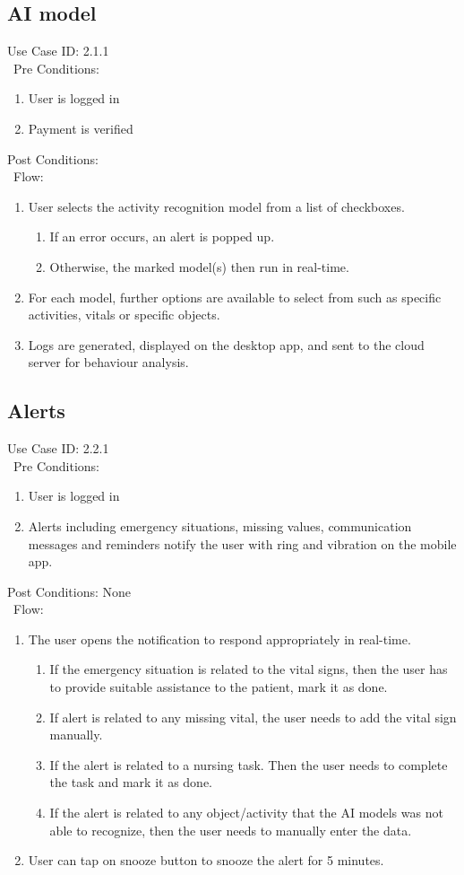 \subsection{AI model} 
Use Case ID: 2.1.1\\\
Pre Conditions: 
\begin{enumerate}
    \item User is logged in
    \item Payment is verified
\end{enumerate}
Post Conditions:\\\
Flow:
\begin{enumerate}
    \item User selects the activity recognition model from a list of checkboxes. 
    \begin{enumerate}
        \item If an error occurs, an alert is popped up.
        \item Otherwise, the marked model(s) then run in real-time. 
    \end{enumerate}
    \item For each model, further options are available to select from such as specific activities, vitals or specific objects.
    \item Logs are generated, displayed on the desktop app, and sent to the cloud server for behaviour analysis. 
\end{enumerate}
\subsection{Alerts} 
Use Case ID: 2.2.1\\\
Pre Conditions: 
\begin{enumerate}
    \item User is logged in
    \item Alerts including emergency situations, missing values, communication messages and reminders notify the user with ring and vibration on the mobile app. 
\end{enumerate}
Post Conditions: None\\\
Flow: 
\begin{enumerate}
    \item The user opens the notification to respond appropriately in real-time. 
    \begin{enumerate}
        \item If the emergency situation is related to the vital signs, then the user has to provide suitable assistance to the patient, mark it as done.
        \item If alert is related to any missing vital, the user needs to add the vital sign manually.
        \item If the alert is related to a nursing task. Then the user needs to complete the task and mark it as done.
        \item If the alert is related to any object/activity that the AI models was not able to recognize, then the user needs to manually enter the data.
    \end{enumerate}
    \item User can tap on snooze button to snooze the alert for 5 minutes.
\end{enumerate}
